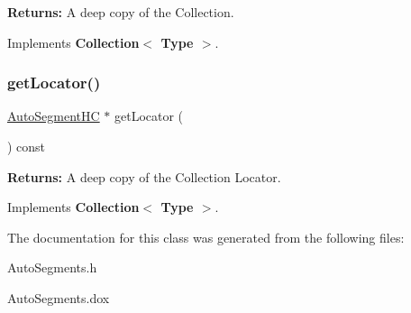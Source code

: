 {\bfseries Returns\+:} A deep copy of the Collection. 

Implements \textbf{ Collection$<$ Type $>$}.

\mbox{\label{classKatabatic_1_1AutoSegments__Aligneds_a07665c070fcc269aec02ce842f384483}} 
\subsubsection{\texorpdfstring{get\+Locator()}{getLocator()}}
{\footnotesize\ttfamily \mbox{\hyperlink{namespaceKatabatic_acb3628dc7705fefe38a665cfe43efa6e}{Auto\+Segment\+HC}} $\ast$ get\+Locator (\begin{DoxyParamCaption}{ }\end{DoxyParamCaption}) const\hspace{0.3cm}{\ttfamily [virtual]}}

{\bfseries Returns\+:} A deep copy of the Collection Locator. 

Implements \textbf{ Collection$<$ Type $>$}.



The documentation for this class was generated from the following files\+:\begin{DoxyCompactItemize}
\item 
Auto\+Segments.\+h\item 
Auto\+Segments.\+dox\end{DoxyCompactItemize}
